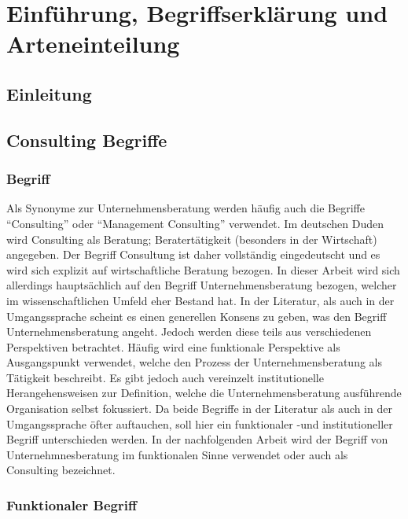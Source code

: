\chapter{Einführung, Begriffserklärung und Arteneinteilung}
\section{Einleitung}
\section{Consulting Begriffe}
\subsection*{Begriff}
Als Synonyme zur Unternehmensberatung werden häufig auch die Begriffe “Consulting”
oder “Management Consulting” verwendet. Im deutschen Duden wird Consulting als Beratung; Beratertätigkeit (besonders in der Wirtschaft) angegeben. Der Begriff Consultung ist daher vollständig eingedeutscht und es wird sich explizit auf wirtschaftliche Beratung bezogen. 
In dieser Arbeit wird sich allerdings hauptsächlich auf den Begriff Unternehmensberatung bezogen, welcher im wissenschaftlichen Umfeld eher Bestand hat.
In der Literatur, als auch in der Umgangssprache scheint es einen generellen Konsens zu geben, was den Begriff Unternehmensberatung angeht. 
Jedoch werden diese teils aus verschiedenen Perspektiven betrachtet. Häufig wird eine funktionale Perspektive als Ausgangspunkt verwendet, welche den Prozess der Unternehmensberatung als Tätigkeit beschreibt. Es gibt jedoch auch vereinzelt institutionelle Herangehensweisen zur Definition, welche die Unternehmensberatung ausführende Organisation selbst fokussiert. Da beide Begriffe in der Literatur als auch in der Umgangssprache öfter auftauchen, soll hier ein funktionaler -und institutioneller Begriff unterschieden werden. In der nachfolgenden Arbeit wird der Begriff von Unternehmnesberatung im funktionalen Sinne verwendet oder auch als Consulting bezeichnet.

\subsection*{Funktionaler Begriff}

